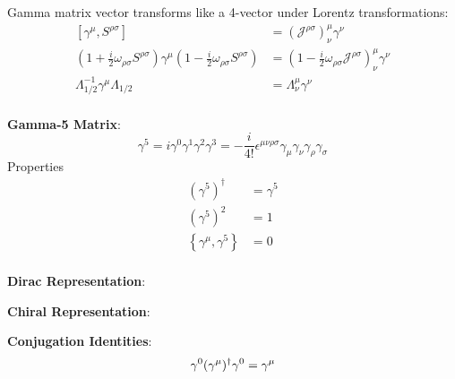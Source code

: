 \documentclass[12pt]{article}
\theoremstyle{definition}
\begin{document}
Gamma matrix vector transforms like a 4-vector under Lorentz transformations:
\begin{equation*}
\begin{split}
    [\gamma^\mu, S^{\rho\sigma}] &= (\mathcal{J}^{\rho\sigma})^\mu_\nu \gamma^\nu \\
    (1 + \frac{i}{2} \omega_{\rho\sigma} S^{\rho\sigma}) \gamma^\mu (1 - \frac{i}{2} \omega_{\rho\sigma} S^{\rho\sigma}) &= (1 - \frac{i}{2} \omega_{\rho\sigma} \mathcal{J}^{\rho\sigma})^\mu_\nu \gamma^\nu \\
    \Lambda^{-1}_{1/2} \gamma^\mu \Lambda_{1/2} &= \Lambda^\mu_\nu \gamma^\nu \\
\end{split}
\end{equation*}


\textbf{Gamma-5 Matrix}:
\begin{equation*}
    \gamma^5 = i \gamma^0 \gamma^1 \gamma^2 \gamma^3 = -\frac{i}{4!} \epsilon^{\mu\nu\rho\sigma} \gamma_\mu \gamma_\nu \gamma_\rho \gamma_\sigma
\end{equation*}
Properties
\begin{equation*}
\begin{split}
    (\gamma^5)^\dagger &= \gamma^5 \\
    (\gamma^5)^2 &= 1 \\
    \left\{ \gamma^\mu, \gamma^5 \right\} &= 0 \\
\end{split}
\end{equation*}

\textbf{Dirac Representation}:

\textbf{Chiral Representation}:

\textbf{Conjugation Identities}:
\begin{equation*}
    \gamma^0 (\gamma^\mu)^\dagger \gamma^0 = \gamma^\mu \\
\end{equation*}
\end{document}
